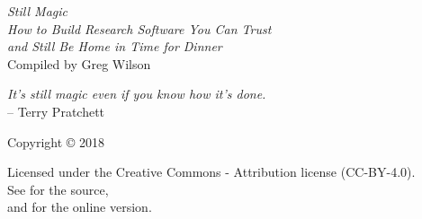 \pagestyle{empty}

{\begingroup
  \raggedleft
  \vspace*{\baselineskip}

  {\Huge\itshape Still Magic}\\[\baselineskip]

  {\large\itshape
    How to Build Research Software You Can Trust \\
    and Still Be Home in Time for Dinner
  }\\[0.2\textheight]

  {\large Compiled by Greg Wilson}\par

  \vfill

  \emph{It's still magic even if you know how it's done.} \\
  -- Terry Pratchett

  \vfill

  {\large Copyright {\copyright} 2018}

  \vspace*{\baselineskip}

  {\small
    Licensed under the Creative Commons - Attribution license (CC-BY-4.0).
    \\
    See {\repository} for the source,\\
    and {\website} for the online version.
  }

\endgroup}

\newpage

\pagestyle{empty}

~

\newpage

\tableofcontents

\newpage

\pagestyle{empty}

~

\newpage

\pagestyle{plain}
